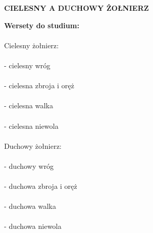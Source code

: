 \documentclass[10pt,a4paper,oneside]{article}
\begin{document}
\centerline{\textbf{\MakeUppercase{Cielesny a duchowy żołnierz}}}
\begin{center}
\textbf{Wersety do studium:} 

\end{center}
\paragraph{}
Cielesny żołnierz:
\paragraph{}
- cielesny wróg
\paragraph{}
- cielesna zbroja i oręż
\paragraph{}
- cielesna walka
\paragraph{}
- cielesna niewola
\paragraph{}
Duchowy żołnierz:
\paragraph{}
- duchowy wróg
\paragraph{}
- duchowa zbroja i oręż
\paragraph{}
- duchowa walka
\paragraph{}
- duchowa niewola
\end{document}
